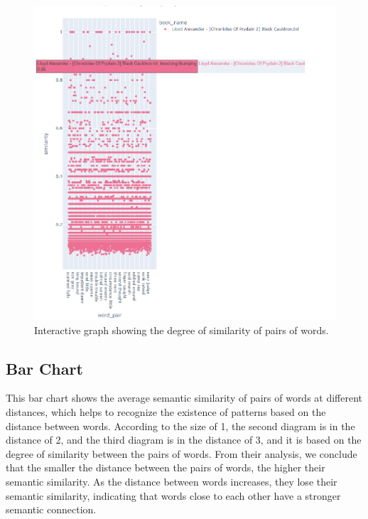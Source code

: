 \documentclass{article}
\begin{document}
\begin{figure}[H]
    \centering
    \includegraphics[width=1.0\textwidth]{img/Interactive Visualization.png}
    \caption{Interactive graph showing the degree of similarity of pairs of words.}
    \label{fig:interactive_visualization}
\end{figure}

\subsection{Bar Chart}

This bar chart shows the average semantic similarity of pairs of words at different distances, which helps to recognize the existence of patterns based on the distance between words. According to the size of 1, the second diagram is in the distance of 2, and the third diagram is in the distance of 3, and it is based on the degree of similarity between the pairs of words. From their analysis, we conclude that the smaller the distance between the pairs of words, the higher their semantic similarity. As the distance between words increases, they lose their semantic similarity, indicating that words close to each other have a stronger semantic connection.
\end{document}
